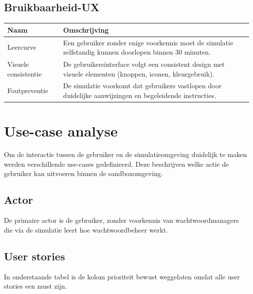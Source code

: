 \subsection{Bruikbaarheid-UX}

\begin{table}[H]
\centering
\begin{tabularx}{\textwidth}{l X}
\toprule
\textbf{Naam} & \textbf{Omschrijving} \\
\midrule

Leercurve & Een gebruiker zonder enige voorkennis moet de simulatie zelfstandig kunnen doorlopen binnen 30 minuten. \\

Visuele consistentie & De gebruikersinterface volgt een consistent design met visuele elementen (knoppen, iconen, kleurgebruik). \\

Foutpreventie & De simulatie voorkomt dat gebruikers vastlopen door duidelijke aanwijzingen en begeleidende instructies. \\

\bottomrule
\end{tabularx}
\end{table}

\section{Use-case analyse}
Om de interactie tussen de gebruiker en de simulatieomgeving duidelijk te maken werden verschillende use-cases gedefinieerd. Deze beschrijven welke actie de gebruiker kan uitvoeren binnen de sandboxomgeving.

\subsection{Actor}
De primaire actor is de gebruiker, zonder voorkennis van wachtwoordmanagers die via de simulatie leert hoe wachtwoordbeheer werkt.

\subsection{User stories}
In onderstaande tabel is de kolom prioriteit bewust weggelaten omdat alle user stories een must zijn.


